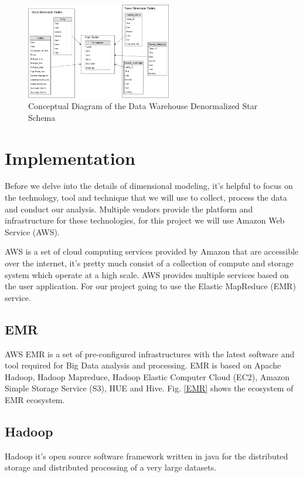 \documentclass[journal]{IEEEtran}
\begin{document}
	
	\begin{figure}
		\centering
		\includegraphics[width=2.5in]{Star_Conceptual_Schema.png}
		\caption{Conceptual Diagram of the Data Warehouse 
			Denormalized Star Schema}
		\label{star}
	\end{figure}
	
	\section{Implementation}
	
	Before we delve into the details of dimensional modeling, it's helpful to focus on the technology, tool and technique that we will use to collect, process the data and conduct our analysis. Multiple vendors provide the platform and infrastructure for these technologies, for this project we will use Amazon Web Service (AWS).
	
	AWS is a set of cloud computing services provided by Amazon that are accessible over the internet, it’s pretty much consist of a collection of compute and storage system which operate at a high scale. AWS provides multiple services based on the user application. For our project going to use the Elastic MapReduce (EMR) service.
	
	\subsection{EMR}
	
	AWS EMR is a set of pre-configured infrastructures with the latest software and tool required for Big Data analysis and processing. EMR is based on Apache Hadoop, Hadoop Mapreduce, Hadoop Elastic Computer Cloud (EC2), Amazon Simple Storage Service (S3), HUE and Hive. Fig. \ref{EMR} shows the ecosystem of EMR ecosystem.
	
	\subsection{Hadoop}
	
	Hadoop it’s open source software framework written in java for the distributed storage and distributed processing of a very large datasets.
	
\end{document}
